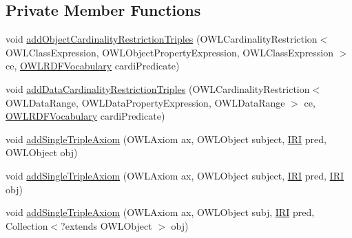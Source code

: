 \subsection*{Private Member Functions}
\begin{DoxyCompactItemize}
\item 
void \hyperlink{classorg_1_1coode_1_1owlapi_1_1rdf_1_1model_1_1_abstract_translator_3_01_n_o_d_e_00_01_r_e_s_o_ubc597564c2cb8c8d2b0139cb32f3f91c_a470d6c5aa479e216bf3327dc53ba6608}{add\-Object\-Cardinality\-Restriction\-Triples} (O\-W\-L\-Cardinality\-Restriction$<$ O\-W\-L\-Class\-Expression, O\-W\-L\-Object\-Property\-Expression, O\-W\-L\-Class\-Expression $>$ ce, \hyperlink{enumorg_1_1semanticweb_1_1owlapi_1_1vocab_1_1_o_w_l_r_d_f_vocabulary}{O\-W\-L\-R\-D\-F\-Vocabulary} cardi\-Predicate)
\item 
void \hyperlink{classorg_1_1coode_1_1owlapi_1_1rdf_1_1model_1_1_abstract_translator_3_01_n_o_d_e_00_01_r_e_s_o_ubc597564c2cb8c8d2b0139cb32f3f91c_a6b9cfc3b2c60caa64c6f562b229893f0}{add\-Data\-Cardinality\-Restriction\-Triples} (O\-W\-L\-Cardinality\-Restriction$<$ O\-W\-L\-Data\-Range, O\-W\-L\-Data\-Property\-Expression, O\-W\-L\-Data\-Range $>$ ce, \hyperlink{enumorg_1_1semanticweb_1_1owlapi_1_1vocab_1_1_o_w_l_r_d_f_vocabulary}{O\-W\-L\-R\-D\-F\-Vocabulary} cardi\-Predicate)
\item 
void \hyperlink{classorg_1_1coode_1_1owlapi_1_1rdf_1_1model_1_1_abstract_translator_3_01_n_o_d_e_00_01_r_e_s_o_ubc597564c2cb8c8d2b0139cb32f3f91c_a4666cc78d46b0dac4c6fc63c2d5959b6}{add\-Single\-Triple\-Axiom} (O\-W\-L\-Axiom ax, O\-W\-L\-Object subject, \hyperlink{classorg_1_1semanticweb_1_1owlapi_1_1model_1_1_i_r_i}{I\-R\-I} pred, O\-W\-L\-Object obj)
\item 
void \hyperlink{classorg_1_1coode_1_1owlapi_1_1rdf_1_1model_1_1_abstract_translator_3_01_n_o_d_e_00_01_r_e_s_o_ubc597564c2cb8c8d2b0139cb32f3f91c_afee18f40a22aab1d9ec05aea3275d1f0}{add\-Single\-Triple\-Axiom} (O\-W\-L\-Axiom ax, O\-W\-L\-Object subject, \hyperlink{classorg_1_1semanticweb_1_1owlapi_1_1model_1_1_i_r_i}{I\-R\-I} pred, \hyperlink{classorg_1_1semanticweb_1_1owlapi_1_1model_1_1_i_r_i}{I\-R\-I} obj)
\item 
void \hyperlink{classorg_1_1coode_1_1owlapi_1_1rdf_1_1model_1_1_abstract_translator_3_01_n_o_d_e_00_01_r_e_s_o_ubc597564c2cb8c8d2b0139cb32f3f91c_a7f62dc0703d5391dd5f26d1be3a4f0c3}{add\-Single\-Triple\-Axiom} (O\-W\-L\-Axiom ax, O\-W\-L\-Object subj, \hyperlink{classorg_1_1semanticweb_1_1owlapi_1_1model_1_1_i_r_i}{I\-R\-I} pred, Collection$<$?extends O\-W\-L\-Object $>$ obj)

\end{DoxyCompactItemize}
